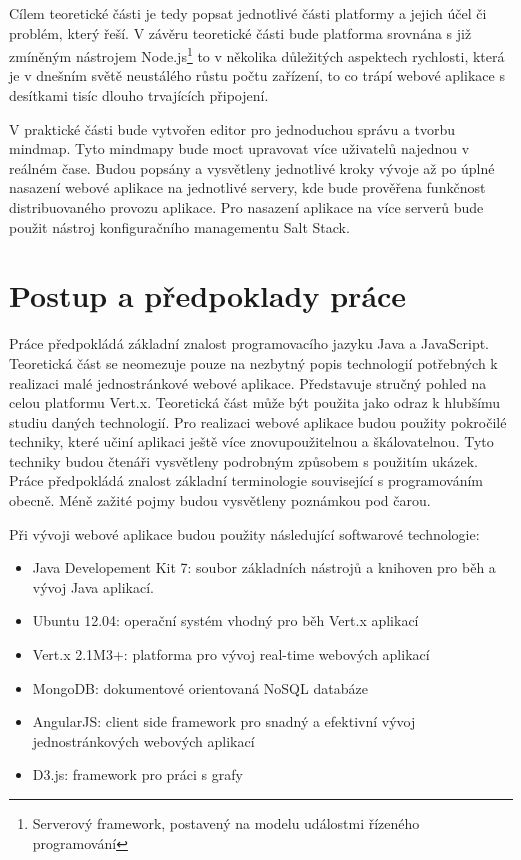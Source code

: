 Cílem teoretické části je tedy popsat jednotlivé části platformy a jejich účel či problém, který řeší. V závěru teoretické části bude platforma srovnána s již zmíněným nástrojem Node.js\footnote{Serverový framework, postavený na modelu událostmi řízeného programování} to v několika důležitých aspektech rychlosti, která je v dnešním světě neustálého růstu počtu zařízení, to co trápí webové aplikace s desítkami tisíc dlouho trvajících připojení.

V praktické části bude vytvořen editor pro jednoduchou správu a tvorbu mindmap. Tyto mindmapy bude moct upravovat více uživatelů najednou v reálném čase. Budou popsány a vysvětleny jednotlivé kroky vývoje až po úplné nasazení webové aplikace na jednotlivé servery, kde bude prověřena funkčnost distribuovaného provozu aplikace. Pro nasazení aplikace na více serverů bude použit nástroj konfiguračního managementu Salt Stack.

\section{Postup a předpoklady práce}

Práce předpokládá základní znalost programovacího jazyku Java a JavaScript. Teoretická část se neomezuje pouze na nezbytný popis technologií potřebných k realizaci malé jednostránkové webové aplikace. Představuje stručný pohled na celou platformu Vert.x. Teoretická část může být použita jako odraz k hlubšímu studiu daných technologií. Pro realizaci webové aplikace budou použity pokročilé techniky, které učiní aplikaci ještě více znovupoužitelnou a škálovatelnou. Tyto techniky budou čtenáři vysvětleny podrobným způsobem s použitím ukázek. Práce předpokládá znalost základní terminologie související s programováním obecně. Méně zažité pojmy budou vysvětleny poznámkou pod čarou.

Při vývoji webové aplikace budou použity následující softwarové technologie:
\begin{itemize}
\item Java Developement Kit 7: soubor základních nástrojů a knihoven pro běh a vývoj Java aplikací.
\item Ubuntu 12.04: operační systém vhodný pro běh Vert.x aplikací
\item Vert.x 2.1M3+: platforma pro vývoj real-time webových aplikací
\item MongoDB: dokumentové orientovaná NoSQL databáze
\item AngularJS: client side framework pro snadný a efektivní vývoj jednostránkových webových aplikací
\item D3.js: framework pro práci s grafy
\end{itemize}